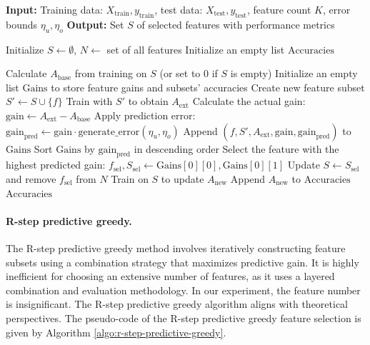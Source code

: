 \begin{algorithm}[ht!]
\caption{Single-Step Predictive Greedy Feature Selection} \label{algo:oracle-simulation}
\begin{algorithmic}[1]
\State \textbf{Input:} Training data: \( X_{\text{train}}, y_{\text{train}} \), test data: \( X_{\text{test}}, y_{\text{test}} \), feature count \( K \), error bounds \( \eta_u, \eta_o \)
\State \textbf{Output:} Set \( S \) of selected features with performance metrics

\State Initialize \( S \gets \emptyset \), \( N \gets \) set of all features
\State Initialize an empty list \( \text{Accuracies} \)

    \State Calculate \( A_{\text{base}} \) from training on \( S \) (or set to 0 if \( S \) is empty)
    \State Initialize an empty list \( \text{Gains} \) to store feature gains and subsets' accuracies
        \State Create new feature subset \( S' \gets S \cup \{f\} \)
        \State Train with \( S' \) to obtain \( A_{\text{ext}} \)
        \State Calculate the actual gain: \( \text{gain} \gets A_{\text{ext}} - A_{\text{base}} \)
        \State Apply prediction error: \( \text{gain}_{\text{pred}} \gets \text{gain} \cdot \text{generate\_error}(\eta_u, \eta_o) \)
        \State Append \( (f, S', A_{\text{ext}}, \text{gain}, \text{gain}_{\text{pred}}) \) to \( \text{Gains} \)
    \EndFor
    \State Sort \( \text{Gains} \) by \( \text{gain}_{\text{pred}} \) in descending order
    \State Select the feature with the highest predicted gain: \( f_{\text{sel}}, S_{\text{sel}} \gets \text{Gains}[0][0], \text{Gains}[0][1] \)
    \State Update \( S \gets S_{\text{sel}} \) and remove \( f_{\text{sel}} \) from \( N \)
    \State Train on \( S \) to update \( A_{\text{new}} \)
    \State Append \( A_{\text{new}} \) to \( \text{Accuracies} \)
\EndWhile
\State \Return \( \text{Accuracies} \)
\end{algorithmic}
\end{algorithm}


\paragraph{R-step predictive greedy.} The R-step predictive greedy method involves iteratively constructing feature subsets using a combination strategy that maximizes predictive gain. It is highly inefficient for choosing an extensive number of features, as it uses a layered combination and evaluation methodology. In our experiment, the feature number is insignificant. The R-step predictive greedy algorithm aligns with theoretical perspectives. The pseudo-code of the R-step predictive greedy feature selection is given by Algorithm \ref{algo:r-step-predictive-greedy}. 

